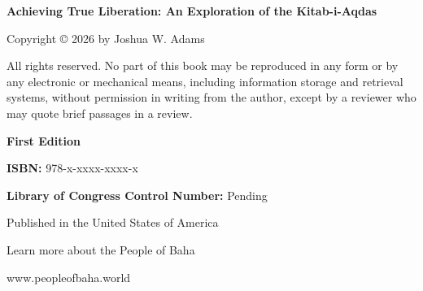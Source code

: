 \frontmatter

\thispagestyle{empty}
\vspace*{1cm}

\noindent\textbf{Achieving True Liberation: An Exploration of the Kitab-i-Aqdas}

\noindent Copyright © 2026 by Joshua W. Adams

\noindent All rights reserved. No part of this book may be reproduced in any form or by any electronic or mechanical means, including information storage and retrieval systems, without permission in writing from the author, except by a reviewer who may quote brief passages in a review.

\vfill

\noindent \textbf{First Edition}

\noindent \textbf{ISBN:} 978-x-xxxx-xxxx-x

\noindent \textbf{Library of Congress Control Number:} Pending

\noindent Published in the United States of America

\noindent Learn more about the People of Baha

\noindent www.peopleofbaha.world

\clearpage